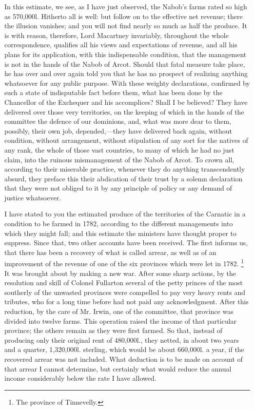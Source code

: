 In this estimate, we see, as I have just observed, the Nabob's farms rated so high as 570,000l. Hitherto all is well: but follow on to the effective net revenue; there the illusion vanishes; and you will not find nearly so much as half the produce. It is with reason, therefore, Lord Macartney invariably, throughout the whole correspondence, qualifies all his views and expectations of revenue, and all his plans for its application, with this indispensable condition, that the management is not in the hands of the Nabob of Arcot. Should that fatal measure take place, he has over and over again told you that he has no prospect of realizing anything whatsoever for any public purpose. With these weighty declarations, confirmed by such a state of indisputable fact before them, what has been done by the Chancellor of the Exchequer and his accomplices? Shall I be believed? They have delivered over those very territories, on the keeping of which in the hands of the committee the defence of our dominions, and, what was more dear to them, possibly, their own job, depended,—they have delivered back again, without condition, without arrangement, without stipulation of any sort for the natives of any rank, the whole of those vast countries, to many of which he had no just claim, into the ruinous mismanagement of the Nabob of Arcot. To crown all, according to their miserable practice, whenever they do anything transcendently absurd, they preface this their abdication of their trust by a solemn declaration that they were not obliged to it by any principle of policy or any demand of justice whatsoever.

I have stated to you the estimated produce of the territories of the Carnatic in a condition to be farmed in 1782, according to the different managements into which they might fall; and this estimate the ministers have thought proper to suppress. Since that, two other accounts have been received. The first informs us, that there has been a recovery of what is called arrear, as well as of an improvement of the revenue of one of the six provinces which were let in 1782.
\footnote{ The province of Tinnevelly.}
 It was brought about by making a new war. After some sharp actions, by the resolution and skill of Colonel Fullarton several of the petty princes of the most southerly of the unwasted provinces were compelled to pay very heavy rents and tributes, who for a long time before had not paid any acknowledgment. After this reduction, by the care of Mr. Irwin, one of the committee, that province was divided into twelve farms. This operation raised the income of that particular province; the others remain as they were first farmed. So that, instead of producing only their original rent of 480,000l., they netted, in about two years and a quarter, 1,320,000l. sterling, which would be about 660,000l. a year, if the recovered arrear was not included. What deduction is to be made on account of that arrear I cannot determine, but certainly what would reduce the annual income considerably below the rate I have allowed.

